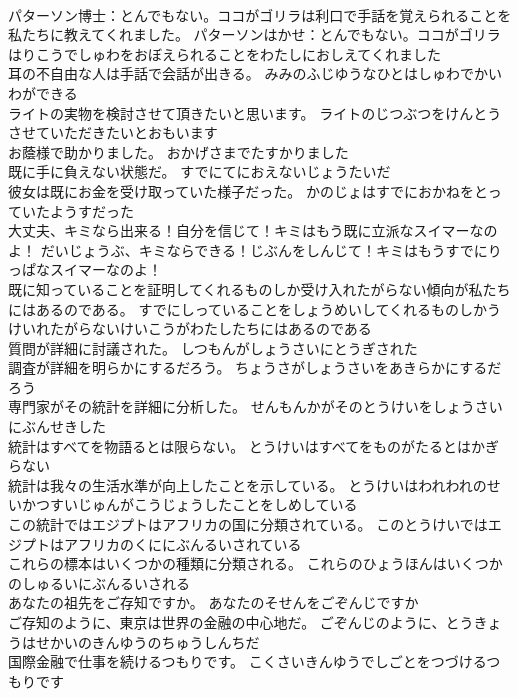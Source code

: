 \documentclass[8pt]{extreport}
\begin{document}
\begin{CJK}{UTF8}{min}
\\	パターソン博士：とんでもない。ココがゴリラは利口で手話を覚えられることを私たちに教えてくれました。	パターソンはかせ：とんでもない。ココがゴリラはりこうでしゅわをおぼえられることをわたしにおしえてくれました 
\\	耳の不自由な人は手話で会話が出きる。	みみのふじゆうなひとはしゅわでかいわができる 
\\	ライトの実物を検討させて頂きたいと思います。	ライトのじつぶつをけんとうさせていただきたいとおもいます 
\\	お蔭様で助かりました。	おかげさまでたすかりました 
\\	既に手に負えない状態だ。	すでにてにおえないじょうたいだ 
\\	彼女は既にお金を受け取っていた様子だった。	かのじょはすでにおかねをとっていたようすだった 
\\	大丈夫、キミなら出来る！自分を信じて！キミはもう既に立派なスイマーなのよ！	だいじょうぶ、キミならできる！じぶんをしんじて！キミはもうすでにりっぱなスイマーなのよ！ 
\\	既に知っていることを証明してくれるものしか受け入れたがらない傾向が私たちにはあるのである。	すでにしっていることをしょうめいしてくれるものしかうけいれたがらないけいこうがわたしたちにはあるのである 
\\	質問が詳細に討議された。	しつもんがしょうさいにとうぎされた 
\\	調査が詳細を明らかにするだろう。	ちょうさがしょうさいをあきらかにするだろう 
\\	専門家がその統計を詳細に分析した。	せんもんかがそのとうけいをしょうさいにぶんせきした 
\\	統計はすべてを物語るとは限らない。	とうけいはすべてをものがたるとはかぎらない 
\\	統計は我々の生活水準が向上したことを示している。	とうけいはわれわれのせいかつすいじゅんがこうじょうしたことをしめしている 
\\	この統計ではエジプトはアフリカの国に分類されている。	このとうけいではエジプトはアフリカのくににぶんるいされている 
\\	これらの標本はいくつかの種類に分類される。	これらのひょうほんはいくつかのしゅるいにぶんるいされる 
\\	あなたの祖先をご存知ですか。	あなたのそせんをごぞんじですか 
\\	ご存知のように、東京は世界の金融の中心地だ。	ごぞんじのように、とうきょうはせかいのきんゆうのちゅうしんちだ 
\\	国際金融で仕事を続けるつもりです。	こくさいきんゆうでしごとをつづけるつもりです 

\end{CJK}
\end{document}
